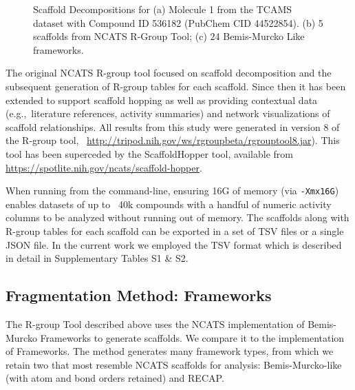 \documentclass[journal=jacsat,biochem,manuscript=article]{achemso}
\newcommand*\eg{e.g.,~}
\begin{document}
\begin{figure}
\caption{Scaffold Decompositions for (a) Molecule 1 from the TCAMS dataset with Compound ID 536182 (PubChem CID 44522854). (b) 5 scaffolds from NCATS R-Group Tool; (c) 24 Bemis-Murcko Like frameworks.}
\label{fig:scafmethod}
\end{figure}


The original NCATS R-group tool focused on scaffold decomposition and
the subsequent generation of R-group tables for each scaffold. Since
then it has been extended to support scaffold hopping as well as
providing contextual data (\eg literature references, activity
summaries) and network visualizations of scaffold relationships. All
results from this study were generated in version 8 of the R-group tool,
~\url{http://tripod.nih.gov/ws/rgroupbeta/rgrouptool8.jar}). This tool
has been superceded by the ScaffoldHopper tool, available from \url{https://spotlite.nih.gov/ncats/scaffold-hopper}.


When running from the command-line, ensuring 16G of memory (via
\texttt{-Xmx16G}) enables datasets of up to ~40k compounds with a
handful of numeric activity columns to be analyzed without running out
of memory. The scaffolds along with R-group tables for each scaffold
can be exported in a set of TSV files or a single JSON file. In the
current work we employed the TSV format which is described in detail
in Supplementary Tables S1 \& S2.

\subsection{Fragmentation Method: Frameworks}
\label{sec:gskframe}
The R-group Tool described above uses the NCATS implementation of
Bemis-Murcko Frameworks to generate scaffolds. We compare it to the
\citet{Harper2004DDclus} implementation of Frameworks.
The method generates many framework types, from which we retain two that
most resemble NCATS scaffolds for analysis: Bemis-Murcko-like\cite{BemisMurcko1996}
(with atom and bond orders retained) and RECAP\cite{Lewell:1998aa}. 

\end{document}
